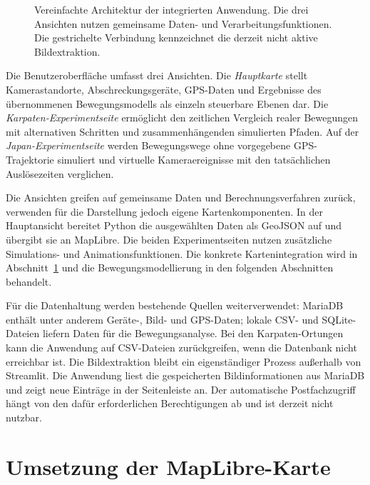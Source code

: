 \documentclass[12pt,a4paper]{report}
\begin{document}
\begin{figure}[htbp]

\caption{Vereinfachte Architektur der integrierten
Anwendung. Die drei Ansichten nutzen gemeinsame
Daten- und Verarbeitungsfunktionen. Die
gestrichelte Verbindung kennzeichnet die
derzeit nicht aktive Bildextraktion.}

\label{fig:architektur-integriert}

\end{figure}


Die Benutzeroberfläche umfasst drei Ansichten. Die \emph{Hauptkarte} stellt Kamerastandorte, Abschreckungsgeräte, GPS-Daten und Ergebnisse des übernommenen Bewegungsmodells als einzeln steuerbare Ebenen dar. Die \emph{Karpaten-Experimentseite} ermöglicht den zeitlichen Vergleich realer Bewegungen mit alternativen Schritten und zusammenhängenden simulierten Pfaden. Auf der \emph{Japan-Experimentseite} werden Bewegungswege ohne vorgegebene GPS-Trajektorie simuliert und virtuelle Kameraereignisse mit den tatsächlichen Auslösezeiten verglichen.

Die Ansichten greifen auf gemeinsame Daten und Berechnungsverfahren zurück, verwenden für die Darstellung jedoch eigene Kartenkomponenten. In der Hauptansicht bereitet Python die ausgewählten Daten als GeoJSON auf und übergibt sie an MapLibre. Die beiden Experimentseiten nutzen zusätzliche Simulations- und Animationsfunktionen. Die konkrete Kartenintegration wird in Abschnitt~\ref{sec:kartenvisualisierung} und die Bewegungsmodellierung in den folgenden Abschnitten behandelt.

Für die Datenhaltung werden bestehende Quellen weiterverwendet: MariaDB enthält unter anderem Geräte-, Bild- und GPS-Daten; lokale CSV- und SQLite-Dateien liefern Daten für die Bewegungsanalyse. Bei den Karpaten-Ortungen kann die Anwendung auf CSV-Dateien zurückgreifen, wenn die Datenbank nicht erreichbar ist. Die Bildextraktion bleibt ein eigenständiger Prozess außerhalb von Streamlit. Die Anwendung liest die gespeicherten Bildinformationen aus MariaDB und zeigt neue Einträge in der Seitenleiste an. Der automatische Postfachzugriff hängt von den dafür erforderlichen Berechtigungen ab und ist derzeit nicht nutzbar.



\section{Umsetzung der MapLibre-Karte}
\label{sec:kartenvisualisierung}
\end{document}

